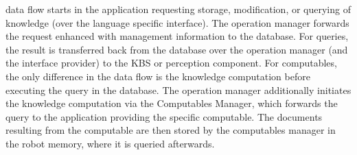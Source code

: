 data flow starts in the application requesting storage, modification,
or querying of knowledge (over the language specific interface). The
operation manager forwards the request enhanced with management
information to the database. For queries, the result is transferred
back from the database over the operation manager (and the interface
provider) to the KBS or perception component. For computables, the
only difference in the data flow is the knowledge computation before
executing the query in the database. The operation manager
additionally initiates the knowledge computation via the Computables
Manager, which forwards the query to the application providing the
specific computable. The documents resulting from the computable are
then stored by the computables manager in the robot memory, where it
is queried afterwards.
